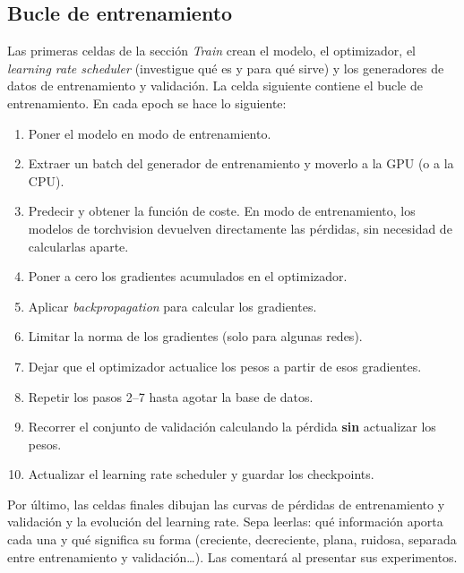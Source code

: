 \documentclass[12pt,a4paper]{article}
\begin{document}
\subsection{Bucle de entrenamiento}
\label{sec:semana2-train-loop}

Las primeras celdas de la sección \textit{Train} crean el modelo, el optimizador, el \textit{learning rate scheduler} (investigue qué es y para qué sirve) y los generadores de datos de entrenamiento y validación. La celda siguiente contiene el bucle de entrenamiento. En cada epoch se hace lo siguiente:

\begin{enumerate}
    \item Poner el modelo en modo de entrenamiento.
    \item Extraer un batch del generador de entrenamiento y moverlo a la GPU (o a la CPU).
    \item Predecir y obtener la función de coste. En modo de entrenamiento, los modelos de torchvision devuelven directamente las pérdidas, sin necesidad de calcularlas aparte.
    \item Poner a cero los gradientes acumulados en el optimizador.
    \item Aplicar \textit{backpropagation} para calcular los gradientes.
    \item Limitar la norma de los gradientes (solo para algunas redes).
    \item Dejar que el optimizador actualice los pesos a partir de esos gradientes.
    \item Repetir los pasos 2--7 hasta agotar la base de datos.
    \item Recorrer el conjunto de validación calculando la pérdida \textbf{sin} actualizar los pesos.
    \item Actualizar el learning rate scheduler y guardar los checkpoints.
\end{enumerate}

Por último, las celdas finales dibujan las curvas de pérdidas de entrenamiento y validación y la evolución del learning rate. Sepa leerlas: qué información aporta cada una y qué significa su forma (creciente, decreciente, plana, ruidosa, separada entre entrenamiento y validación\dots). Las comentará al presentar sus experimentos.
\end{document}
